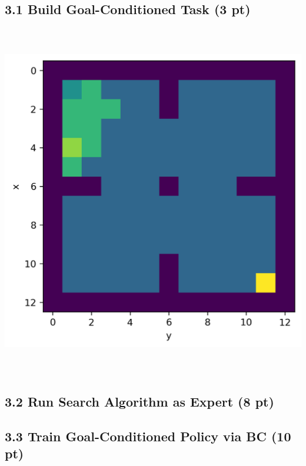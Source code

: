 \documentclass[12pt]{article}
\begin{document}
\subsection*{3.1 Build Goal-Conditioned Task (3 pt)}
\includegraphics[height= 15.5cm, width=15.5cm]{p3-1-1}



\subsection*{3.2 Run Search Algorithm as Expert (8 pt)}

\begin{tcolorbox}[fit,height=30em, width=40em, blank, borderline={1pt}{1pt},nobeforeafter]
\begin{center}

\end{center}
\end{tcolorbox}



\subsection*{3.3 Train Goal-Conditioned Policy via BC (10 pt)}
\end{document}
